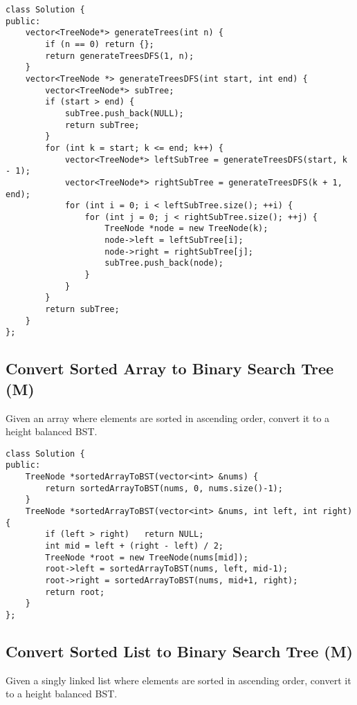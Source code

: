 \begin{lstlisting}
class Solution {
public:
    vector<TreeNode*> generateTrees(int n) {
        if (n == 0) return {};
        return generateTreesDFS(1, n);
    }
    vector<TreeNode *> generateTreesDFS(int start, int end) {
        vector<TreeNode*> subTree;
        if (start > end) {
            subTree.push_back(NULL);
            return subTree;
        }
        for (int k = start; k <= end; k++) {
            vector<TreeNode*> leftSubTree = generateTreesDFS(start, k - 1);
            vector<TreeNode*> rightSubTree = generateTreesDFS(k + 1, end);
            for (int i = 0; i < leftSubTree.size(); ++i) {
                for (int j = 0; j < rightSubTree.size(); ++j) {
                    TreeNode *node = new TreeNode(k);
                    node->left = leftSubTree[i];
                    node->right = rightSubTree[j];
                    subTree.push_back(node);
                }
            }
        }
        return subTree;
    }
};
\end{lstlisting}


\subsection{Convert Sorted Array to Binary Search Tree (M)}
Given an array where elements are sorted in ascending order, convert it to a height balanced BST.\\

\begin{lstlisting}
class Solution {
public:
    TreeNode *sortedArrayToBST(vector<int> &nums) {
        return sortedArrayToBST(nums, 0, nums.size()-1);
    }
    TreeNode *sortedArrayToBST(vector<int> &nums, int left, int right) {
        if (left > right)   return NULL;
        int mid = left + (right - left) / 2;
        TreeNode *root = new TreeNode(nums[mid]);
        root->left = sortedArrayToBST(nums, left, mid-1);
        root->right = sortedArrayToBST(nums, mid+1, right);
        return root;
    }
};
\end{lstlisting}


\subsection{Convert Sorted List to Binary Search Tree (M)}
Given a singly linked list where elements are sorted in ascending order, convert it to a height balanced BST.\\

